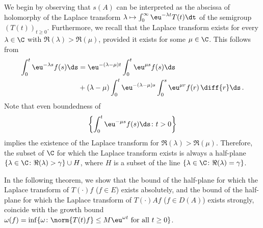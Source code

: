 We begin by observing that $s(A)$ can be interpreted as the abscissa of holomorphy of the Laplace transform $\lambda \mapsto \int_{0}^{\infty} \eu^{-\lambda t} T(t)  \dt$ of the semigroup $(T(t))_{t \geq 0}$.
Furthermore, we recall that the Laplace transform exists for every $\lambda \in \C$ with $\Re(\lambda) > \Re(\mu)$, provided it exists for some $\mu\in\C$.
This follows from 
\begin{equation}\label{eq:a4-1.1}
\begin{split}
\int_0^t \eu^{-\lambda s} f(s) \ds &= \eu^{-(\lambda-\mu)t} \int_{0}^{t} \eu^{\mu s} f(s)  \ds \\ 
&+ (\lambda - \mu) \int_{0}^{t} \eu^{-(\lambda-\mu)s} \int_{0}^{s} \eu^{\mu r} f(r) \,\diff{r} \ds \,. 
\end{split}
\end{equation}
Note that even boundedness of 
\[
\left\{ \int_{0}^{t} \eu^{-\mu s}f(s)  \ds \colon t > 0\right\}
\]
implies the existence of the Laplace transform for $\Re(\lambda) > \Re(\mu)$. 
Therefore, the subset of\/ $\C$ for which the Laplace transform exists is always a half-plane 
$\{\lambda \in \C\colon\Re(\lambda)\allowbreak > \gamma\} \cup H$, where $H$ is a subset of the line $\{\lambda \in \C\colon\Re(\lambda) = \gamma\}$.

In the following theorem, we show that the bound of the half-plane for which the Laplace transform of\/ $T(\cdot)f$ ($f \in E$) exists absolutely, and the bound of the half-plane for which the Laplace transform of\/ $T(\cdot)Af$ ($f \in D(A)$) exists strongly, coincide with the growth bound $\omega(f) = \inf\{\omega\colon\norm{T(t)f} \leq M\eu^{\omega t} \text{ for all } t \geq 0\}$.

